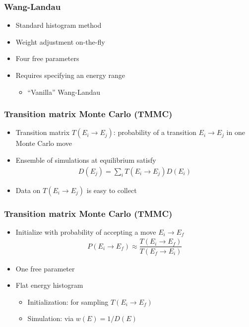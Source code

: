 \documentclass{beamer}
\newcommand{\p}[1]{\left(#1\right)} %
\newcommand{\f}[2]{\dfrac{#1}{#2}}
\let\olditem\item
\renewcommand{\item}{\setlength{\itemsep}{6pt}\olditem}
\begin{document}
\begin{frame}
  \frametitle{Wang-Landau}
  \begin{itemize}
  \item Standard histogram method
  \item Weight adjustment on-the-fly
  \item Four free parameters
  \item Requires specifying an energy range
    \begin{itemize}
    \item ``Vanilla'' Wang-Landau
    \end{itemize}
  \end{itemize}
\end{frame}

\begin{frame}
  \frametitle{Transition matrix Monte Carlo (TMMC)}
  \begin{itemize}
  \item Transition matrix $T\p{E_i\to E_j}$: probability of a
    transition $E_i\to E_j$ in one Monte Carlo move
  \item Ensemble of simulations at equilibrium satisfy
    \begin{align*}
      D\p{E_j}=\sum_iT\p{E_i\to E_j}D\p{E_i}
    \end{align*}
  \item Data on $T\p{E_i\to E_j}$ is easy to collect
  \end{itemize}
\end{frame}

\begin{frame}
  \frametitle{Transition matrix Monte Carlo (TMMC)}
  \begin{itemize}
  \item Initialize with probability of accepting a move $E_i\to E_f$
    \begin{align*}
      P\p{E_i\to E_f}\approx\f{T\p{E_i\to E_f}}{T\p{E_f\to E_i}}
    \end{align*}
  \item One free parameter
  \item Flat energy histogram
    \begin{itemize}
    \item Initialization: for sampling $T\p{E_i\to E_f}$
    \item Simulation: via $w\p{E}=1/D\p{E}$
    \end{itemize}
  \end{itemize}
\end{frame}
\end{document}
